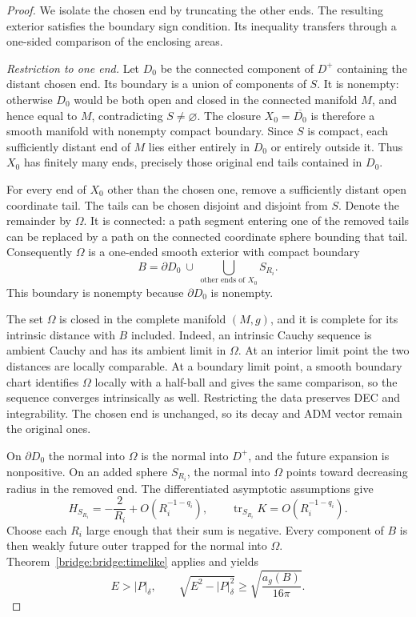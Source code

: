 \begin{proof}
We isolate the chosen end by truncating the other ends. The resulting
exterior satisfies the boundary sign condition. Its inequality transfers
through a one-sided comparison of the enclosing areas.

\emph{Restriction to one end.} Let $D_0$ be the connected component of
$D^+$ containing the distant
chosen end. Its boundary is a union of components of $S$. It is
nonempty: otherwise $D_0$ would be both open and closed in the connected
manifold $M$, and hence equal to $M$, contradicting $S\ne\varnothing$.
The closure $X_0=\overline{D_0}$ is therefore a smooth manifold with
nonempty compact boundary. Since $S$ is compact, each sufficiently
distant end of $M$ lies either entirely in $D_0$ or entirely outside
it. Thus $X_0$ has finitely many ends, precisely those original end
tails contained in $D_0$.

For every end of $X_0$ other than the chosen one, remove a sufficiently
distant open coordinate tail. The tails can be chosen disjoint and
disjoint from $S$. Denote the remainder by $\Omega$. It is connected: a
path segment entering one of the removed tails can be replaced by
a path on the connected coordinate sphere bounding that tail.
Consequently $\Omega$ is a one-ended smooth exterior with compact boundary
\[
             B=\partial D_0\ \cup\
               \bigcup_{\text{other ends of }X_0} S_{R_i}.
\]
This boundary is nonempty because $\partial D_0$ is nonempty.

The set $\Omega$ is closed in the complete manifold $(M,g)$, and it is
complete for its intrinsic distance with $B$ included. Indeed, an
intrinsic Cauchy sequence is ambient Cauchy and has its ambient limit
in $\Omega$. At an interior limit point the two distances are locally
comparable. At a boundary limit point, a smooth boundary chart
identifies $\Omega$ locally with a half-ball and gives the same comparison,
so the sequence converges intrinsically as well. Restricting the data
preserves DEC and integrability. The chosen end is unchanged, so its
decay and ADM vector remain the original ones.

On $\partial D_0$ the normal into $\Omega$ is the normal into $D^+$, and
the future expansion is nonpositive. On an added sphere $S_{R_i}$,
the normal into $\Omega$ points toward decreasing radius in the removed
end. The differentiated asymptotic assumptions give
\[
 H_{S_{R_i}}=-\frac{2}{R_i}+O(R_i^{-1-q_i}),\qquad
 \operatorname{tr}_{S_{R_i}}K=O(R_i^{-1-q_i}).
\]
Choose each $R_i$ large enough that their sum is negative. Every
component of $B$ is then weakly future outer trapped for the normal
into $\Omega$. Theorem~\ref{bridge:bridge:timelike} applies and yields
\begin{equation}
\label{bridge:bridge:restricted-inequality}
 E>|P|_\delta,\qquad
 \sqrt{E^2-|P|_\delta^2}\ge\sqrt{\frac{a_g(B)}{16\pi}}.
\end{equation}


\end{proof}
